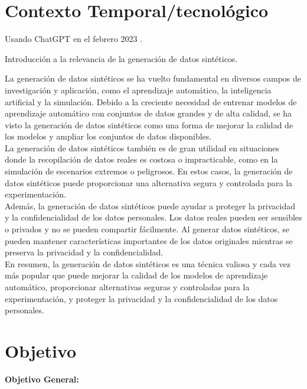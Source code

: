 \newpage
\section{Contexto Temporal/tecnológico}

Usando ChatGPT en el febrero 2023 \cite{openai_chatgpt_2023}.
\begin{prompt}
    Introducción a la relevancia de la generación de datos sintéticos.
\end{prompt}

\begin{chatGPT}
La generación de datos sintéticos se ha vuelto fundamental en diversos campos de investigación y aplicación, como el aprendizaje automático, la inteligencia artificial y la simulación. Debido a la creciente necesidad de entrenar modelos de aprendizaje automático con conjuntos de datos grandes y de alta calidad, se ha visto la generación de datos sintéticos como una forma de mejorar la calidad de los modelos y ampliar los conjuntos de datos disponibles.\\

La generación de datos sintéticos también es de gran utilidad en situaciones donde la recopilación de datos reales es costosa o impracticable, como en la simulación de escenarios extremos o peligrosos. En estos casos, la generación de datos sintéticos puede proporcionar una alternativa segura y controlada para la experimentación.\\

Además, la generación de datos sintéticos puede ayudar a proteger la privacidad y la confidencialidad de los datos personales. Los datos reales pueden ser sensibles o privados y no se pueden compartir fácilmente. Al generar datos sintéticos, se pueden mantener características importantes de los datos originales mientras se preserva la privacidad y la confidencialidad.\\

En resumen, la generación de datos sintéticos es una técnica valiosa y cada vez más popular que puede mejorar la calidad de los modelos de aprendizaje automático, proporcionar alternativas seguras y controladas para la experimentación, y proteger la privacidad y la confidencialidad de los datos personales.

\end{chatGPT}
\newpage

\section{Objetivo}
\textbf{Objetivo General:}

